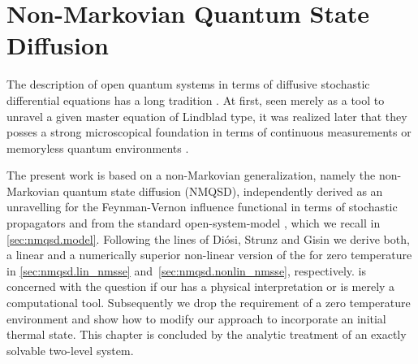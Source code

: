 \chapter{Non-Markovian Quantum State Diffusion}
\label{chap:nmqsd}
%

The description of open quantum systems in terms of diffusive stochastic differential equations has a long tradition \cite{Ca93_quantum_optics,Pe98_qsd,GaZo04_quantum_noise}.
At first, seen merely as a tool to unravel a given master equation of Lindblad type, it was realized later that they posses a strong microscopical foundation in terms of continuous measurements or memoryless quantum environments \cite{BaGr09_trajectories,WiMi10_measurement}.

%

The present work is based on a non-Markovian generalization, namely the non-Markovian quantum state diffusion (\textsc{NMQSD}), independently derived as an unravelling for the Feynman-Vernon influence functional in terms of stochastic propagators \cite{St96_lin_nmqsd} and from the standard open-system-model \cite{Di96_wave_eq}, which we recall in \autoref{sec:nmqsd.model}.
Following the lines of Diósi, Strunz and Gisin \cite{DiSt97_nmsse,DiGiSt98_nmqsd,StDiGi99_nmq_traj} we derive both, a linear and a numerically superior non-linear version of the \NMSSE for zero temperature in \autoref{sec:nmqsd.lin_nmsse} and~\ref{sec:nmqsd.nonlin_nmsse}, respectively.
 is concerned with the question if our \NMSSE has a physical interpretation or is merely a computational tool.
Subsequently we drop the requirement of a zero temperature environment and show how to modify our approach to incorporate an initial thermal state.
This chapter is concluded by the analytic treatment of an exactly solvable two-level system.


